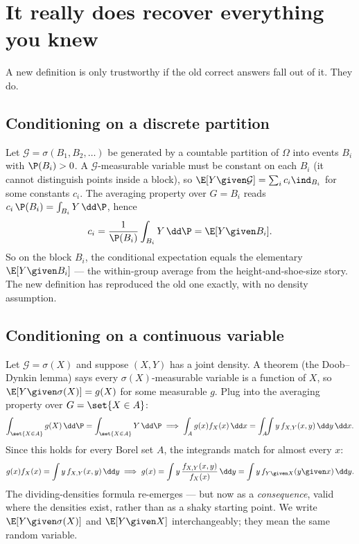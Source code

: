 \section{It really does recover everything you knew}
\label{ch38:recovers}

A new definition is only trustworthy if the old correct answers fall out of it. They do.

\subsection{Conditioning on a discrete partition}
\label{ch38:discrete-recover}

Let $\mathcal{G} = \sigma(B_1, B_2, \dots)$ be generated by a countable partition of $\Omega$ into
events $B_i$ with $\P(B_i) > 0$. A $\mathcal{G}$-measurable variable must be constant on each $B_i$
(it cannot distinguish points inside a block), so $\E[Y\given\mathcal{G}] = \sum_i c_i \ind_{B_i}$
for some constants $c_i$. The averaging property over $G = B_i$ reads $c_i\,\P(B_i) = \int_{B_i}
Y\,\dd\P$, hence
\[
  c_i = \frac{1}{\P(B_i)} \int_{B_i} Y \,\dd\P = \E[Y \given B_i].
\]
So on the block $B_i$, the conditional expectation equals the elementary $\E[Y \given B_i]$ --- the
within-group average from the height-and-shoe-size story. The new definition has reproduced the old
one exactly, with no density assumption.

\subsection{Conditioning on a continuous variable}
\label{ch38:continuous-recover}

Let $\mathcal{G} = \sigma(X)$ and suppose $(X, Y)$ has a joint density. A theorem (the Doob--Dynkin
lemma) says every $\sigma(X)$-measurable variable is a function of $X$, so $\E[Y\given\sigma(X)] =
g(X)$ for some measurable $g$. Plug into the averaging property over $G = \set{X \in A}$:
\[
  \int_{\set{X\in A}} g(X)\,\dd\P = \int_{\set{X\in A}} Y\,\dd\P
  \;\Longrightarrow\;
  \int_A g(x) f_X(x)\,\dd x = \int_A \!\!\int y\, f_{X,Y}(x,y)\,\dd y\,\dd x.
\]
Since this holds for every Borel set $A$, the integrands match for almost every $x$:
\[
  g(x) f_X(x) = \int y\, f_{X,Y}(x,y)\,\dd y
  \;\Longrightarrow\;
  g(x) = \int y\,\frac{f_{X,Y}(x,y)}{f_X(x)}\,\dd y = \int y\, f_{Y\given X}(y\given x)\,\dd y.
\]
The dividing-densities formula re-emerges --- but now as a \emph{consequence}, valid where the
densities exist, rather than as a shaky starting point. We write $\E[Y\given\sigma(X)]$ and
$\E[Y\given X]$ interchangeably; they mean the same random variable.

